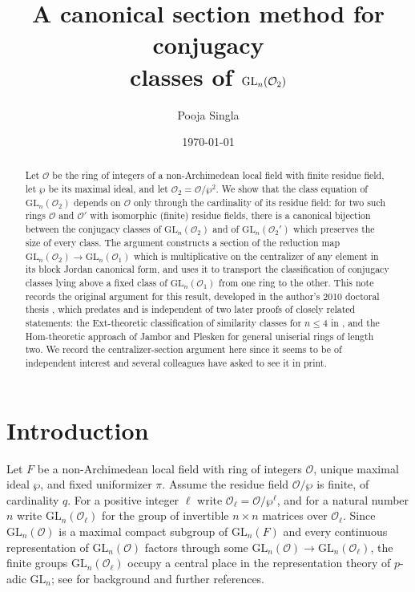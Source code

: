 \documentclass[11pt]{amsart}
\title[Conjugacy classes of $\GL_n(\mathcal O_2)$ via a canonical section]
{A canonical section method for conjugacy \\ classes of $\GL_n(\mathcal O_2)$}
\author{Pooja Singla}
\date{\today}
\theoremstyle{definition}
\newcommand{\GL}{\mathrm{GL}}
\begin{document}
	
	\begin{abstract}
		Let $\mathcal O$ be the ring of integers of a non-Archimedean local field with
		finite residue field, let $\wp$ be its maximal ideal, and let
		$\mathcal O_2 = \mathcal O/\wp^2$. We show that the class equation of
		$\GL_n(\mathcal O_2)$ depends on $\mathcal O$ only through the cardinality
		of its residue field: for two such rings $\mathcal O$ and $\mathcal O'$
		with isomorphic (finite) residue fields, there is a canonical bijection
		between the conjugacy classes of $\GL_n(\mathcal O_2)$ and of
		$\GL_n(\mathcal O_2')$ which preserves the size of every class. The
		argument constructs a section of the reduction map
		$\GL_n(\mathcal O_2)\to \GL_n(\mathcal O_1)$ which is multiplicative on
		the centralizer of any element in its block Jordan canonical form, and
		uses it to transport the classification of conjugacy classes lying above
		a fixed class of $\GL_n(\mathcal O_1)$ from one ring to the other. This
		note records the original argument for this result, developed in the
		author's 2010 doctoral thesis \cite{Thesis}, which predates and is
		independent of two later proofs of closely related statements: the
		Ext-theoretic classification of similarity classes for $n\le 4$ in
		\cite{PSS2015}, and the Hom-theoretic approach of Jambor and Plesken
		\cite{JP2012} for general uniserial rings of length two. We record the
		centralizer-section argument here since it seems to be of independent
		interest and several colleagues have asked to see it in print.
	\end{abstract}
	
	\maketitle
	
	\section{Introduction}
	
	Let $F$ be a non-Archimedean local field with ring of integers $\mathcal O$,
	unique maximal ideal $\wp$, and fixed uniformizer $\pi$. Assume the residue
	field $\mathcal O/\wp$ is finite, of cardinality $q$. For a positive integer
	$\ell$ write $\mathcal O_\ell = \mathcal O/\wp^\ell$, and for a natural
	number $n$ write $\GL_n(\mathcal O_\ell)$ for the group of invertible
	$n\times n$ matrices over $\mathcal O_\ell$. Since $\GL_n(\mathcal O)$ is a
	maximal compact subgroup of $\GL_n(F)$ and every continuous representation
	of $\GL_n(\mathcal O)$ factors through some $\GL_n(\mathcal O)\to
	\GL_n(\mathcal O_\ell)$, the finite groups $\GL_n(\mathcal O_\ell)$ occupy a
	central place in the representation theory of $p$-adic $\GL_n$; see
	\cite{Green55,Hill93,Hill95,Onn08,AOPS} for background and further
	references.
	
\end{document}
